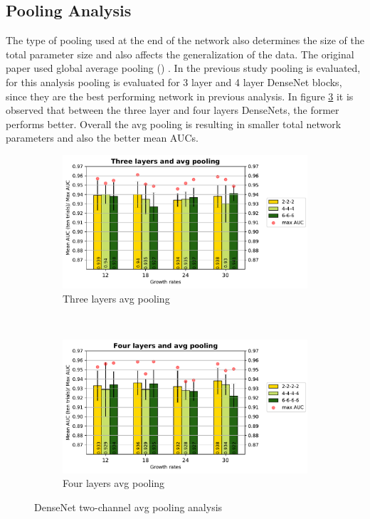 \subsection{Pooling Analysis}
The type of pooling used at the end of the network also determines the size of the total parameter size and also affects the generalization of the data. The original paper \cite{densenet} used global average pooling () \cite{lin2013network}. 
In the previous study  pooling is evaluated, for this analysis  pooling is evaluated for 3 layer and 4 layer DenseNet blocks, since they are the best performing network in previous analysis. In figure 
\ref{fig:dense_avg_pooling_1} it is observed that between the three layer and four layers DenseNets, the former performs better. Overall the avg pooling is resulting in smaller total network parameters and also the better mean AUCs.

\begin{figure}
  \centering
  \begin{subfigure}[b]{0.4\textwidth}
    \includegraphics[width=\textwidth]{images/densenet/simple/densenet_simple_three_layer_avg_bar}
    \caption{Three layers avg pooling }
    \label{fig:densenet_simple_three_layer_avg_bar}
  \end{subfigure}
  ~ %
  \begin{subfigure}[b]{0.4\textwidth}
    \includegraphics[width=\textwidth]{images/densenet/simple/densenet_simple_four_layer_avg_bar}
    \caption{Four layers avg pooling}
    \label{fig:densenet_simple_four_layer_avg_bar}
  \end{subfigure}    
  \caption{DenseNet two-channel avg pooling analysis}
  \label{fig:dense_avg_pooling_1}
\end{figure}

